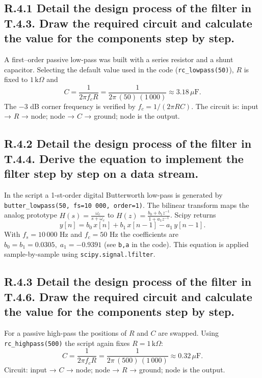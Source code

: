 \documentclass{article}
\begin{document}
\subsection*{R.4.1 Detail the design process of the filter in T.4.3. Draw the required circuit and calculate the value for the components step by step.}

A first–order passive low-pass was built with a series resistor and a shunt capacitor.  
Selecting the default value used in the code (\texttt{rc\_lowpass(50)}), $R$ is fixed to $1\,\mathrm{k}\Omega$ and  
\[
C=\frac{1}{2\pi f_c R}=\frac{1}{2\pi\,(50)\,(1\,000)}\approx 3.18\,\mu\mathrm{F}.
\]
The −3 dB corner frequency is verified by $f_c = 1/(2\pi RC)$.  
The circuit is: input → $R$ → node; node → $C$ → ground; node is the output.

\subsection*{R.4.2 Detail the design process of the filter in T.4.4. Derive the equation to implement the filter step by step on a data stream.}

In the script a 1-st-order digital Butterworth low-pass is generated by  
\texttt{butter\_lowpass(50, fs=10\,000, order=1)}.  
The bilinear transform maps the analog prototype \( H(s)=\frac{\omega_c}{s+\omega_c} \) to  
\( H(z)=\frac{b_0+b_1z^{-1}}{1+a_1z^{-1}} \).  
Scipy returns
\[ y[n]=b_0\,x[n]+b_1\,x[n-1]-a_1\,y[n-1]. \]
With \(f_s=10\,000\) Hz and \(f_c=50\) Hz the coefficients are
\( b_0=b_1=0.0305,\; a_1=-0.9391 \) (see \texttt{b,a} in the code).  
This equation is applied sample-by-sample using \texttt{scipy.signal.lfilter}.

\subsection*{R.4.3 Detail the design process of the filter in T.4.6. Draw the required circuit and calculate the value for the components step by step.}

For a passive high-pass the positions of $R$ and $C$ are swapped.  
Using \texttt{rc\_highpass(500)} the script again fixes $R=1\,\mathrm{k}\Omega$:  
\[
C=\frac{1}{2\pi f_c R}=\frac{1}{2\pi\,(500)\,(1\,000)}\approx 0.32\,\mu\mathrm{F}.
\]
Circuit: input → $C$ → node; node → $R$ → ground; node is the output.

\end{document}
